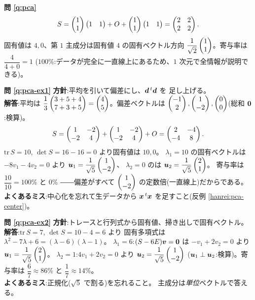 \bigskip
\noindent\textbf{問 \ref{q:pca}}\quad
\[
S = \begin{pmatrix}1 \\ 1\end{pmatrix}\begin{pmatrix}1 & 1\end{pmatrix} + O + \begin{pmatrix}1 \\ 1\end{pmatrix}\begin{pmatrix}1 & 1\end{pmatrix}
= \begin{pmatrix}2 & 2 \\ 2 & 2\end{pmatrix}.
\]
固有値は $4, 0$、第 $1$ 主成分は固有値 $4$ の固有ベクトル方向
$\dfrac{1}{\sqrt{2}}\begin{pmatrix}1 \\ 1\end{pmatrix}$。寄与率は $\dfrac{4}{4 + 0} = 1$
($100\%$:データが完全に一直線上にあるため、$1$ 次元で全情報が説明できる)。

\bigskip
\noindent\textbf{問 \ref{q:pca-ex1}}\quad
\textbf{方針}:平均を引いて偏差にし、$\bm{d}\,{}^t\bm{d}$ を
足し上げる。\\
\textbf{解答}:平均は $\dfrac{1}{3}\begin{pmatrix}3 + 5 + 4 \\ 7 + 3 + 5\end{pmatrix}
= \begin{pmatrix}4 \\ 5\end{pmatrix}$。偏差ベクトルは
$\begin{pmatrix}-1 \\ 2\end{pmatrix}, \begin{pmatrix}1 \\ -2\end{pmatrix}, \begin{pmatrix}0 \\ 0\end{pmatrix}$(総和 $\bm{0}$:検算)。
\[
S = \begin{pmatrix}1 & -2 \\ -2 & 4\end{pmatrix} + \begin{pmatrix}1 & -2 \\ -2 & 4\end{pmatrix} + O
= \begin{pmatrix}2 & -4 \\ -4 & 8\end{pmatrix}.
\]
$\mathrm{tr}\,S = 10$, $\det S = 16 - 16 = 0$ より固有値は $10, 0$。
$\lambda_1 = 10$ の固有ベクトルは $-8v_1 - 4v_2 = 0$ より
$\bm{u}_1 = \dfrac{1}{\sqrt{5}}\begin{pmatrix}1 \\ -2\end{pmatrix}$、
$\lambda_2 = 0$ のは $\bm{u}_2 = \dfrac{1}{\sqrt{5}}\begin{pmatrix}2 \\ 1\end{pmatrix}$。
寄与率は $\dfrac{10}{10} = 100\%$ と $0\%$
――偏差がすべて $\begin{pmatrix}1 \\ -2\end{pmatrix}$ の定数倍(一直線上)だからである。\\
\textbf{よくあるミス}:中心化を忘れて生データから
$\bm{x}\,{}^t\bm{x}$ を足すこと(反例 \ref{hanrei:pca-center})。
\bigskip

\noindent\textbf{問 \ref{q:pca-ex2}}\quad
\textbf{方針}:トレースと行列式から固有値、掃き出しで固有ベクトル。\\
\textbf{解答}:$\mathrm{tr}\,S = 7$, $\det S = 10 - 4 = 6$ より
固有多項式は $\lambda^2 - 7\lambda + 6 = (\lambda - 6)(\lambda - 1)$。
$\lambda_1 = 6$:$(S - 6E)\bm{v} = \bm{0}$ は
$-v_1 + 2v_2 = 0$ より $\bm{u}_1 = \dfrac{1}{\sqrt{5}}\begin{pmatrix}2 \\ 1\end{pmatrix}$。
$\lambda_2 = 1$:$4v_1 + 2v_2 = 0$ より
$\bm{u}_2 = \dfrac{1}{\sqrt{5}}\begin{pmatrix}1 \\ -2\end{pmatrix}$
($\bm{u}_1 \perp \bm{u}_2$:検算)。寄与率は
$\dfrac{6}{7} \approx 86\%$ と $\dfrac{1}{7} \approx 14\%$。\\
\textbf{よくあるミス}:正規化($\sqrt{5}$ で割る)を忘れること。
主成分は\emph{単位}ベクトルで答える。

